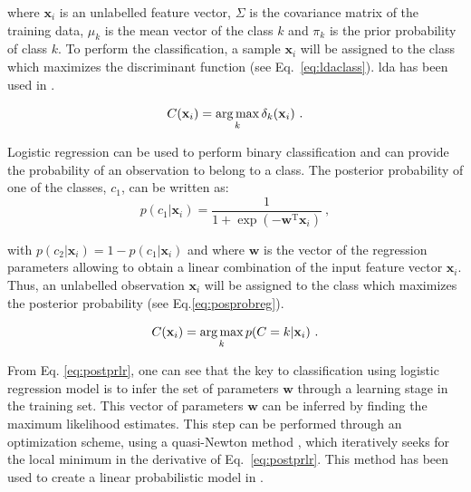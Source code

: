\noindent where $\mathbf{x}_i$ is an unlabelled feature vector, $\Sigma$ is the covariance matrix of the training data, $\mu_k$ is the mean vector of the class $k$ and $\pi_k$ is the prior probability of class $k$.
To perform the classification, a sample $\mathbf{x}_i$ will be assigned to the class which maximizes the discriminant function (see Eq.~\eqref{eq:ldaclass}).
\Ac{lda} has been used in \cite{Antic2013,Chan2003,Niaf2011,Niaf2012,Vos2012}.

\begin{equation}
	C(\mathbf{x}_i) = \operatorname*{arg\,max}_k \delta_k(\mathbf{x}_i) \ .
	\label{eq:ldaclass}
\end{equation}

Logistic regression can be used to perform binary classification and can provide the probability of an observation to belong to a class.
The posterior probability of one of the classes, $c_1$, can be written as:
\begin{equation}
	p(c_1|\mathbf{x}_i) = \frac{1}{1+\exp(-\mathbf{w}^{\text{T}}\mathbf{x}_i)} \ ,
	\label{eq:postprlr}
\end{equation}

\noindent with $p(c_2|\mathbf{x}_i) = 1 - p(c_1|\mathbf{x}_i)$ and where $\mathbf{w}$ is the vector of the regression parameters allowing to obtain a linear combination of the input feature vector $\mathbf{x}_i$.
Thus, an unlabelled observation $\mathbf{x}_i$ will be assigned to the class which maximizes the posterior probability (see Eq.\eqref{eq:posprobreg}).

\begin{equation}
	C(\mathbf{x}_i) = \operatorname*{arg\,max}_k p(C=k|\mathbf{x}_i) \ .
	\label{eq:posprobreg}
\end{equation}

\noindent From Eq. \eqref{eq:postprlr}, one can see that the key to classification using logistic regression model is to infer the set of parameters $\mathbf{w}$ through a learning stage in the training set.
This vector of parameters $\mathbf{w}$ can be inferred by finding the maximum likelihood estimates.
This step can be performed through an optimization scheme, using a quasi-Newton method \cite{Byrd1995}, which iteratively seeks for the local minimum in the derivative of Eq.~\eqref{eq:postprlr}.
This method has been used to create a linear probabilistic model in \cite{Kelm2007,Puech2009}.

